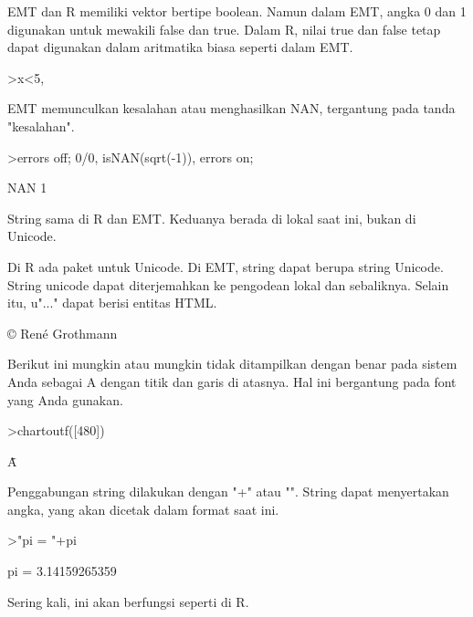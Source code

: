 \documentclass[a4paper,10pt]{article}
\begin{document}
\begin{eulernotebook}
\begin{eulercomment}
EMT dan R memiliki vektor bertipe boolean. Namun dalam EMT, angka 0
dan 1 digunakan untuk mewakili false dan true. Dalam R, nilai true dan
false tetap dapat digunakan dalam aritmatika biasa seperti dalam EMT.
\end{eulercomment}
\begin{eulerprompt}
>x<5, %
\end{eulerprompt}
\begin{euleroutput}
  [0,  0,  1,  0,  0]
  [0,  0,  3.1,  0,  0]
\end{euleroutput}
\begin{eulercomment}
EMT memunculkan kesalahan atau menghasilkan NAN, tergantung pada tanda
"kesalahan".
\end{eulercomment}
\begin{eulerprompt}
>errors off; 0/0, isNAN(sqrt(-1)), errors on;
\end{eulerprompt}
\begin{euleroutput}
  NAN
  1
\end{euleroutput}
\begin{eulercomment}
String sama di R dan EMT. Keduanya berada di lokal saat ini, bukan di
Unicode.

Di R ada paket untuk Unicode. Di EMT, string dapat berupa string
Unicode. String unicode dapat diterjemahkan ke pengodean lokal dan
sebaliknya. Selain itu, u"..." dapat berisi entitas HTML.
\end{eulercomment}
\begin{euleroutput}
  © René Grothmann
\end{euleroutput}
\begin{eulercomment}
Berikut ini mungkin atau mungkin tidak ditampilkan dengan benar pada
sistem Anda sebagai A dengan titik dan garis di atasnya. Hal ini
bergantung pada font yang Anda gunakan.
\end{eulercomment}
\begin{eulerprompt}
>chartoutf([480])
\end{eulerprompt}
\begin{euleroutput}
  Ǡ
\end{euleroutput}
\begin{eulercomment}
Penggabungan string dilakukan dengan "+" atau "\textbar{}". String dapat
menyertakan angka, yang akan dicetak dalam format saat ini.
\end{eulercomment}
\begin{eulerprompt}
>"pi = "+pi
\end{eulerprompt}
\begin{euleroutput}
  pi = 3.14159265359
\end{euleroutput}
\begin{eulercomment}
Sering kali, ini akan berfungsi seperti di R.


\end{eulercomment}
\end{eulernotebook}
\end{document}
